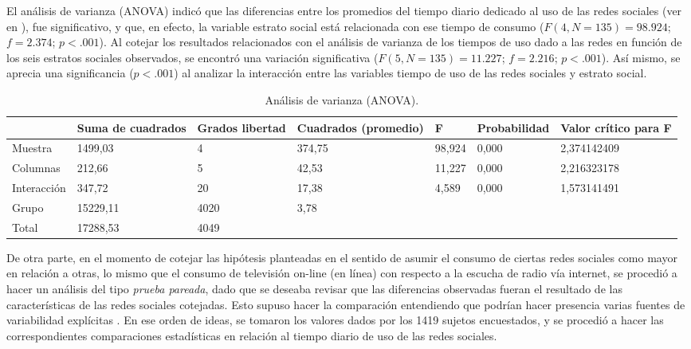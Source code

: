 \documentclass[spanish]{textolivre}
\begin{document}
El análisis de varianza (ANOVA) indicó que las diferencias entre los promedios del tiempo diario dedicado al uso de las redes sociales (ver en ), fue significativo, y que, en efecto, la variable estrato social está relacionada con ese tiempo de consumo ($F(4, N = 135) = 98.924$; $f = 2.374$; $p < .001$). Al cotejar los resultados relacionados con el análisis de varianza de los tiempos de uso dado a las redes en función de los seis estratos sociales observados, se encontró una variación significativa ($F(5, N = 135) = 11.227$; $f = 2.216$; $p < .001$). Así mismo, se aprecia una significancia ($p < .001$) al analizar la interacción entre las variables tiempo de uso de las redes sociales y estrato social.

\begin{table}[htpb]
\caption{Análisis de varianza (ANOVA).}
\label{tab4}
\centering
\begin{tabular}{p{}p{}p{}p{}p{}p{}p{}}
\toprule 
& Suma de cuadrados & Grados libertad & Cuadrados   (promedio) & F & Probabilidad & Valor crítico para F
\\ 
\midrule
Muestra & 1499,03 & 4 & 374,75 & 98,924 & 0,000 & 2,374142409
\\
Columnas & 212,66 & 5 & 42,53 & 11,227 & 0,000 & 2,216323178
\\
Interacción & 347,72 & 20 & 17,38 & 4,589 & 0,000 & 1,573141491
\\
Grupo & 15229,11 & 4020 & 3,78 & & &
\\
Total & 17288,53 & 4049 & & & &
\\ 
\bottomrule
\end{tabular}
\end{table}

De otra parte, en el momento de cotejar las hipótesis planteadas en el sentido de asumir el consumo de ciertas redes sociales como mayor en relación a otras, lo mismo que el consumo de televisión on-line (en línea) con respecto a la escucha de radio vía internet, se procedió a hacer un análisis del tipo \emph{prueba pareada}, dado que se deseaba revisar que las diferencias observadas fueran el resultado de las características de las redes sociales cotejadas. Esto supuso hacer la comparación entendiendo que podrían hacer presencia varias fuentes de variabilidad explícitas \cite{gutierrez_pulido2012, montilla2010}. En ese orden de ideas, se tomaron los valores dados por los 1419 sujetos encuestados, y se procedió a hacer las correspondientes comparaciones estadísticas en relación al tiempo diario de uso de las redes sociales.
\end{document}

